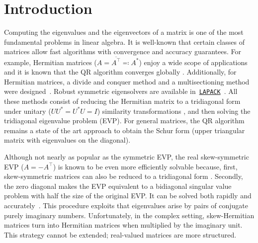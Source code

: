 \documentclass[10pt,twoside,dvipsnames]{siamart1116}
\numberwithin{algorithm}{section}
\numberwithin{equation}{section}
\begin{document}















\section{Introduction}
\renewcommand\labelitemi{$\vcenter{\hbox{\tiny$\bullet$}}$}
Computing the eigenvalues and the eigenvectors of a matrix is one of the most fundamental problems in linear algebra. It is well-known that certain classes of matrices allow fast algorithms with convergence and accuracy guarantees. For example, Hermitian matrices ($A=\overline{A^\top }\eqcolon A^*$) enjoy a wide scope of applications and it is known that the QR algorithm \cite{Francis1961TheQT,Francis1961TheQT2} converges globally \cite{Wilkinson1965,Wilkinsonshifts,WILKINSON1968409}.
Additionally, for Hermitian matrices, a divide and conquer method and  a multisectioning method were designed~\cite{Cuppen80,DongarraSorensen87, Syshin87}. Robust symmetric eigensolvers are available in~\href{https://www.netlib.org/lapack/explore-html/index.html}{\texttt{LAPACK}}~\cite{lapack99,dhillon1997new}. All these methods consist of reducing the Hermitian matrix to a tridiagonal form under unitary ($UU^*=U^*U=I$) similarity transformations \cite{Paige72,Parlett79,SIMON1984,Wilkinson62}, and then solving the tridiagonal eigenvalue problem (EVP). For general matrices, the QR algorithm remains a state of the art approach to obtain the Schur form (upper triangular matrix with eigenvalues on the diagonal).

Although not nearly as popular as the symmetric EVP, the real skew-symmetric EVP ($A = -A^\top $) is known to be even more efficiently solvable \cite{Penke20,WardGray78} because, first, skew-symmetric matrices can also be reduced to a tridiagonal form \cite{HuangJia24,WardGray78}. Secondly, the zero diagonal makes the EVP equivalent to a bidiagonal singular value problem with half the size of the original EVP. It can be solved both rapidly and accurately~\cite{DemmelKahan88,DemmelKahan90, Kurukula94}. This procedure exploits that eigenvalues arise by pairs of conjugate purely imaginary numbers. Unfortunately, in the complex setting, skew-Hermitian matrices turn into Hermitian matrices when multiplied by the imaginary unit. This strategy cannot be extended; real-valued matrices are more structured.
\end{document}
